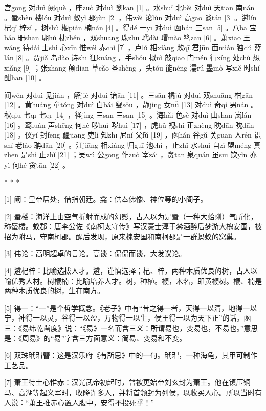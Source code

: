 \documentclass[12pt,UTF8]{ctexbook}
\begin{document}
宫gōng 对duì 阙què ，座zuò 对duì 龛kān [1] 。水shuǐ 北běi 对duì 天tiān 南nán 。蜃shèn 楼lóu 对duì 蚁yǐ 郡jùn [2] ，伟wěi 论lùn 对duì 高gāo 谈tán [3] 。遴lín 杞qǐ 梓zǐ ，树shù 楩pián 楠nán [4] 。得dé 一yī 对duì 函hán 三sān [5] 。八bā 宝bǎo 珊shān 瑚hú 枕zhěn ，双shuāng 珠zhū 玳dài 瑁mào 簪zān [6] 。萧xiāo 王wáng 待dài 士shì 心xīn 惟wéi 赤chì [7] ，卢lú 相xiàng 欺qī 君jūn 面miàn 独dú 蓝lán [8] 。贾jiǎ 岛dǎo 诗shī 狂kuáng ，手shǒu 拟nǐ 敲qiāo 门mén 行xíng 处chù 想xiǎng [9] ；张zhāng 颠diān 草cǎo 圣shèng ，头tóu 能néng 濡rú 墨mò 写xiě 时shí 酣hān [10] 。

闻wén 对duì 见jiàn ，解jiě 对duì 谙ān [11] 。三sān 橘jú 对duì 双shuāng 柑gān [12] 。黄huáng 童tóng 对duì 白bái 叟sǒu ，静jìng 女nǚ [13] 对duì 奇qí 男nán 。秋qiū 七qī 七qī [14] ，径jìng 三sān 三sān [15] 。海hǎi 色sè 对duì 山shān 岚lán [16] 。鸾luán 声shēng 何hé 哕huì 哕huì [17] ，虎hǔ 视shì 正zhèng 眈dān 眈dān [18] 。仪yí 封fēng 疆jiāng 吏lì 知zhī 尼ní 父fǔ [19] ，函hán 谷gǔ 关guān 人rén 识shí 老lǎo 聃dān [20] 。江jiāng 相xiàng 归guī 池chí ，止zhǐ 水shuǐ 自zì 盟méng 真zhēn 是shì 止zhǐ [21] ；吴wú 公gōng 作zuò 宰zǎi ，贪tān 泉quán 虽suī 饮yǐn 亦yì 何hé 贪tān [22] 。



* * *



[1] 阙：皇帝居处，借指朝廷。龛：供奉佛像、神位等的小阁子。

[2] 蜃楼：海洋上由空气折射而成的幻影，古人以为是蜃（一种大蛤蜊）气所化，称蜃楼。蚁郡：唐李公佐《南柯太守传》写汉豪士淳于棼酒醉后梦游大槐安国，被招为附马，守南柯郡。醒后发现，原来槐安国和南柯郡是一群蚂蚁的窝巢。

[3] 伟论：高明超卓的言论。高谈：侃侃而谈，大发议论。

[4] 遴杞梓：比喻选拔人才。遴，谨慎选择；杞、梓，两种木质优良的树，古人以喻优秀人材。树楩楠：比喻培养人才。树，种植。楩，木名，即黄楩树。楩、楠是两种木质优良的树，生在南方。

[5] 得一：“一”是个哲学概念。《老子》中有“昔之得一者，天得一以清，地得一以宁，神得一以灵，谷得一以盈，万物得一以生，侯王得一以为天下正”的话。函三：《易纬乾凿度》说：“《易》一名而含三义：所谓易也，变易也，不易也。”意思是：《周易》的“易”字含三方面意义：简易、变易和不变。

[6] 双珠玳瑁簪：这是汉乐府《有所思》中的一句。玳瑁，一种海龟，其甲可制作工艺品。

[7] 萧王待士心惟赤：汉光武帝初起时，曾被更始帝刘玄封为萧王。他在镇压铜马、高湖等起义军时，收降许多人，并将首领封为列侯，以收买人心。所以当时有人说：“萧王推赤心置人腹中，安得不投死乎！”
\end{document}
